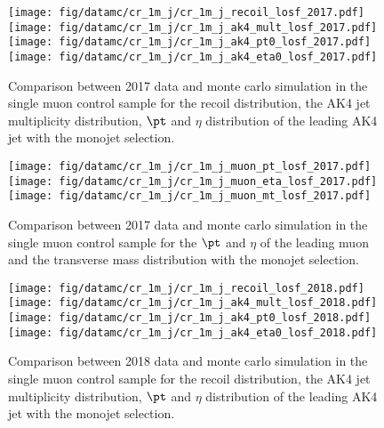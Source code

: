 {\begin{figure}[htbp]
    \begin{center}
        \texttt{[image: fig/datamc/cr\_1m\_j/cr\_1m\_j\_recoil\_losf\_2017.pdf]}
        \texttt{[image: fig/datamc/cr\_1m\_j/cr\_1m\_j\_ak4\_mult\_losf\_2017.pdf]} \\
        \texttt{[image: fig/datamc/cr\_1m\_j/cr\_1m\_j\_ak4\_pt0\_losf\_2017.pdf]}
        \texttt{[image: fig/datamc/cr\_1m\_j/cr\_1m\_j\_ak4\_eta0\_losf\_2017.pdf]}
    \end{center}
    \caption{Comparison between 2017 data and monte carlo simulation in the single muon control sample for
        the recoil distribution, the AK4 jet multiplicity distribution,  $\pt$ and $\eta$ distribution
        of the leading AK4  jet with the monojet selection.}
    \label{fig:SM_monojet_2017}
\end{figure}

\begin{figure}[htbp]
    \begin{center}
        \texttt{[image: fig/datamc/cr\_1m\_j/cr\_1m\_j\_muon\_pt\_losf\_2017.pdf]}
        \texttt{[image: fig/datamc/cr\_1m\_j/cr\_1m\_j\_muon\_eta\_losf\_2017.pdf]} \\
        \texttt{[image: fig/datamc/cr\_1m\_j/cr\_1m\_j\_muon\_mt\_losf\_2017.pdf]}
    \end{center}
    \caption{Comparison between 2017 data and monte carlo simulation in the single muon control sample for
        the $\pt$ and $\eta$ of the leading muon and the transverse mass distribution with the monojet selection.}
    \label{fig:SM_2_monojet_2017}
\end{figure}

\begin{figure}[htbp]
    \begin{center}
        \texttt{[image: fig/datamc/cr\_1m\_j/cr\_1m\_j\_recoil\_losf\_2018.pdf]}
        \texttt{[image: fig/datamc/cr\_1m\_j/cr\_1m\_j\_ak4\_mult\_losf\_2018.pdf]} \\
        \texttt{[image: fig/datamc/cr\_1m\_j/cr\_1m\_j\_ak4\_pt0\_losf\_2018.pdf]}
        \texttt{[image: fig/datamc/cr\_1m\_j/cr\_1m\_j\_ak4\_eta0\_losf\_2018.pdf]}
    \end{center}
    \caption{Comparison between 2018 data and monte carlo simulation in the single muon control sample for
        the recoil distribution, the AK4 jet multiplicity distribution,  $\pt$ and $\eta$ distribution
        of the leading AK4  jet with the monojet selection.}
    \label{fig:SM_monojet_2018}
\end{figure}

}
